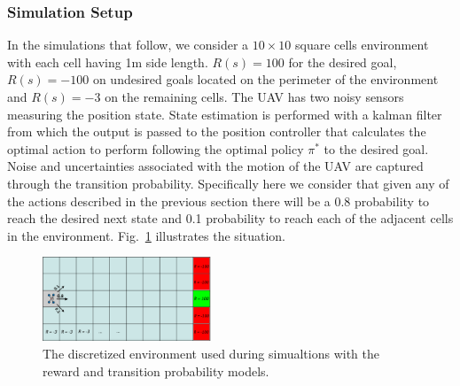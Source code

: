 \documentclass[letterpaper, 10 pt, conference]{ieeeconf}  %
\begin{document}
\subsubsection{Simulation Setup}
In the simulations that follow, we consider a $10\times10$ square cells environment with each cell having 1m side length. $R(s) = 100$ for the desired goal, $R(s) = -100$ on undesired goals located on the perimeter of the environment and $R(s) = -3$ on the remaining cells.  The UAV has two noisy sensors measuring the position state. State estimation is performed with a kalman filter from which the output is passed to the position controller that calculates the optimal action to perform following the optimal policy $\pi^*$ to the desired goal. Noise and uncertainties associated with the motion of the UAV are captured through the transition probability. Specifically here we consider that given any of the actions described in the previous section there will be a 0.8 probability to reach the desired next state and 0.1 probability to reach each of the adjacent cells in the environment. Fig.~\ref{fig:sim-env} illustrates the situation.
%
\begin{figure}[h]
\centering
\includegraphics[width=0.45\textwidth]{sim-env}
\caption{The discretized environment used during simualtions with the reward and transition probability models.} 
 \label{fig:sim-env}
\end{figure}
\end{document}
